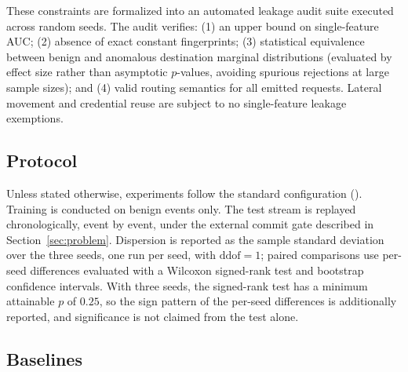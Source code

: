 These constraints are formalized into an automated leakage audit suite executed across
random seeds. The audit verifies: (1) an upper bound on single-feature AUC; (2) absence of exact
constant fingerprints; (3) statistical equivalence between benign and anomalous destination
marginal distributions (evaluated by effect size rather than asymptotic $p$-values, avoiding
spurious rejections at large sample sizes); and (4) valid routing semantics for all emitted
requests. Lateral movement and credential reuse are subject to no single-feature
leakage exemptions.

\subsection{Protocol}

Unless stated otherwise, experiments follow the standard configuration (\PanelAsettings).
Training is conducted on benign events only. The test stream is replayed chronologically,
event by event, under the external commit gate described in Section~\ref{sec:problem}.
Dispersion is reported as the sample standard deviation over the three seeds, one run
per seed, with $\text{ddof}=1$; paired comparisons use per-seed differences evaluated with a
Wilcoxon signed-rank test and bootstrap confidence intervals. With three seeds, the signed-rank
test has a minimum attainable $p$ of $0.25$, so the sign pattern of the
per-seed differences is additionally reported, and significance is not claimed from the test alone.

\subsection{Baselines}

